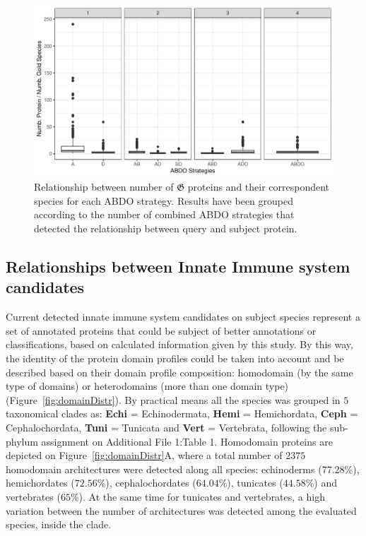 \documentclass[11pt]{article}
\begin{document}
\begin{figure}[ht!]
	\centering
	\includegraphics[scale=0.7]{figures/relationGoldenABDO}
	\caption{Relationship between number of $\boldsymbol{\mathfrak{G}}$ proteins and
	their correspondent species for each ABDO strategy. Results have been grouped
	according to the number of combined ABDO strategies that detected the relationship
	between query and subject protein.}\label{fig:relation}
\end{figure}


\subsection*{Relationships between Innate Immune system candidates}\label{Orthology}

Current detected innate immune system candidates on subject species represent
a set of annotated proteins that could be subject of better annotations or
classifications, based on calculated information given by this study. By this
way, the identity of the protein domain profiles could be taken into account
and be described based on their domain profile composition: homodomain 
(by the same type of domains) or heterodomains (more than one domain type)
(Figure~\ref{fig:domainDistr}). By practical means all the species was grouped 
in $5$ taxonomical clades as: \textbf{Echi} = Echinodermata, \textbf{Hemi} = 
Hemichordata, \textbf{Ceph} = Cephalochordata, \textbf{Tuni} = Tunicata and 
\textbf{Vert} = Vertebrata, following the sub-phylum assignment on Additional 
File 1:Table 1. Homodomain proteins are depicted on Figure~\ref{fig:domainDistr}A, 
where a total number of $2375$ homodomain architectures were detected along all 
species: echinoderms ($77.28$\%), hemichordates ($72.56$\%), cephalochordates 
($64.04$\%), tunicates ($44.58$\%) and vertebrates ($65$\%). At the same time
for tunicates and vertebrates, a high variation between the number of
architectures was detected among the evaluated species, inside the clade.
\end{document}
